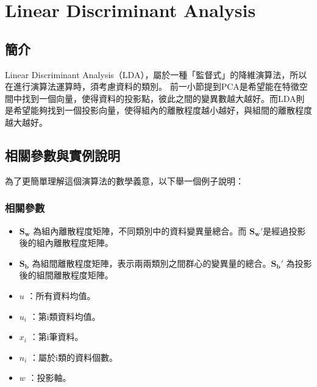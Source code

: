 \chapter{Linear Discriminant Analysis}
\label{chapter:pca}
\section{簡介}
\label{sec:background}




Linear Discriminant Analysis（LDA），屬於一種「監督式」的降維演算法，所以在進行演算法運算時，須考慮資料的類別。
前一小節提到PCA是希望能在特徵空間中找到一個向量，使得資料的投影點，彼此之間的變異數越大越好。而LDA則是希望能夠找到一個投影向量，使得組內的離散程度越小越好，與組間的離散程度越大越好。




\section{相關參數與實例說明}
為了更簡單理解這個演算法的數學義意，以下舉一個例子說明：


\subsection{相關參數}

\begin{itemize}
	\item
	      \(\mathbf{S_w}\) 為組內離散程度矩陣，不同類別中的資料變異量總合。而 \(\mathbf{{S_w}'}\)是經過投影後的組內離散程度矩陣。
	\item
	      \(\mathbf{S_b}\) 為組間離散程度矩陣，表示兩兩類別之間群心的變異量的總合。\(\mathbf{{S_b}'}\) 為投影後的組間離散程度矩陣。
	\item
	      \(u\) ：所有資料均值。
	\item
	      \(u_i\) ：第i類資料均值。
	\item
	      \(x_i\) ：第i筆資料。
	\item
	      \(n_i\) ：屬於i類的資料個數。
	\item
	      \(w\) ：投影軸。
\end{itemize}


